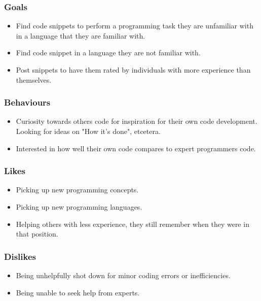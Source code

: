 \documentclass[11pt,a4paper]{article}
\begin{document}
\subsubsection{Goals}

\begin{itemize}
\item Find code snippets to perform a programming task they are unfamiliar
with in a language that they are familiar with.
\item Find code snippet in a language they are not familiar with.
\item Post snippets to have them rated by individuals with more experience than
themselves.
\end{itemize}

\subsubsection{Behaviours}

\begin{itemize}
\item Curiosity towards others code for inspiration for their own code
development. Looking for ideas on "How it's done", etcetera.
\item Interested in how well their own code compares to expert programmers
code.
\end{itemize}

\subsubsection{Likes}

\begin{itemize}
\item Picking up new programming concepts.
\item Picking up new programming languages.
\item Helping others with less experience, they still remember when they were
in that position.
\end{itemize}

\subsubsection{Dislikes}

\begin{itemize}
\item Being unhelpfully shot down for minor coding errors or inefficiencies.
\item Being unable to seek help from experts.
\end{itemize}
\end{document}

